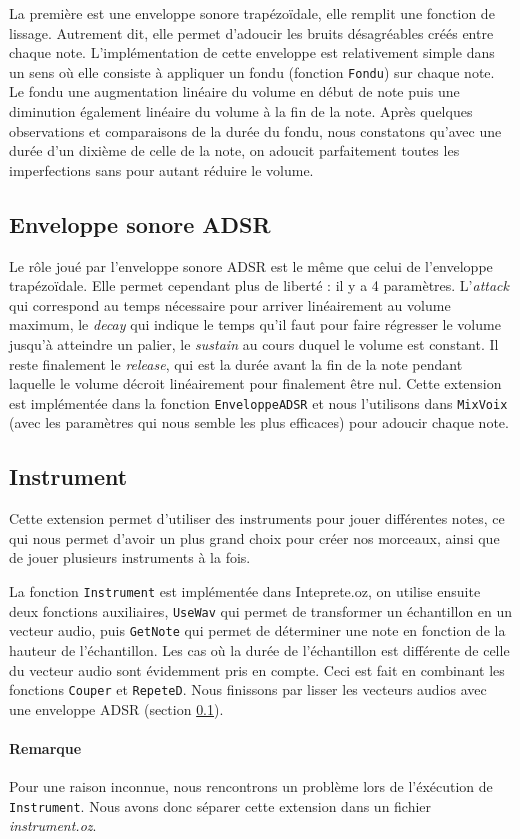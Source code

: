 \documentclass[a4paper,oneside,10pt]{article}
\newcommand{\fun}[1]{\texttt{#1}}
\begin{document}
La première est une enveloppe sonore trapézo\"idale, elle remplit une fonction de lissage.
Autrement dit, elle permet d'adoucir les bruits désagréables créés entre chaque note.
L'implémentation de cette enveloppe est relativement simple dans 
un sens où elle consiste à appliquer un fondu (fonction \fun{Fondu}) sur chaque note. 
Le fondu une augmentation linéaire du volume en début de note puis 
une diminution également linéaire du volume à la fin de la note. 
Après quelques observations et comparaisons de la durée du fondu, 
nous constatons qu'avec une durée d'un dixième de celle de la note, 
on adoucit parfaitement toutes les imperfections sans pour autant 
réduire le volume.


\subsection{Enveloppe sonore ADSR}
\label{subsec:adsr}

Le rôle joué par l'enveloppe sonore ADSR est le même que celui de l'enveloppe trapézo\"idale. 
Elle permet cependant plus de liberté : il y a 4 paramètres. 
L'\emph{attack} qui correspond au temps nécessaire pour arriver linéairement 
au volume maximum, le \emph{decay} qui indique le temps qu'il faut pour faire régresser 
le volume jusqu'à atteindre un palier, le \emph{sustain} au cours duquel le volume est constant. 
Il reste finalement le \emph{release}, qui est la durée avant la fin de la note pendant laquelle 
le volume décroit linéairement pour finalement être nul.
Cette extension est implémentée dans la fonction \fun{EnveloppeADSR} 
et nous l'utilisons dans \fun{MixVoix} (avec les paramètres qui nous semble les plus 
efficaces) pour adoucir chaque note.


\subsection{Instrument}

Cette extension permet d'utiliser des instruments pour jouer différentes notes, 
ce qui nous permet d'avoir un plus grand choix pour créer nos morceaux, 
ainsi que de jouer plusieurs instruments à la fois. 

La fonction \fun{Instrument} est implémentée dans Inteprete.oz, 
on utilise ensuite deux fonctions auxiliaires, \fun{UseWav} qui permet 
de transformer un échantillon en un vecteur audio, puis \fun{GetNote} qui permet 
de déterminer une note en fonction de la hauteur de l'échantillon. 
Les cas où la durée de l'échantillon est différente de celle du vecteur audio 
sont évidemment pris en compte.
Ceci est fait en combinant les fonctions \fun{Couper} et \fun{RepeteD}. 
Nous finissons par lisser les vecteurs audios avec une enveloppe ADSR (section \ref{subsec:adsr}).

\paragraph{Remarque}
Pour une raison inconnue, nous rencontrons un problème lors de l'éxécution de \fun{Instrument}.
Nous avons donc séparer cette extension dans un fichier \textit{instrument.oz}.
\end{document}
